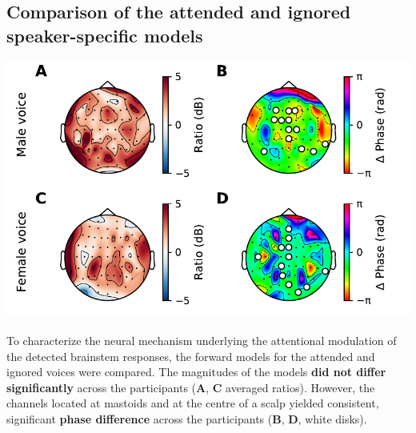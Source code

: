 \documentclass[a0,landscape]{a0poster}
\newenvironment{Figure}
  {\par\medskip\noindent\minipage{\linewidth}}
  {\endminipage\par\medskip}
\begin{document}
\begin{multicols*}{3}
\subsection*{Comparison of the attended and ignored speaker-specific models}
\begin{Figure}
\begin{flushright}
\includegraphics[width=\linewidth,keepaspectratio]
{Figure_4.pdf}
\end{flushright}
\end{Figure}
\endminipage\hfill
{}
\begin{flushleft}
To characterize the neural mechanism underlying the attentional modulation of the detected brainstem responses, the forward models for the attended and ignored voices were compared. The magnitudes of the models \textbf{did not differ significantly} across the participants (\textbf{A}, \textbf{C} averaged ratios). However, the channels located at mastoids and at the centre of a scalp yielded consistent, significant \textbf{phase difference} across the participants (\textbf{B}, \textbf{D}, white disks).
\end{flushleft}
\endminipage\hfill


\end{multicols*}
\end{document}
